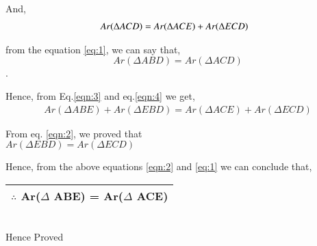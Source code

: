 \documentclass[journal,12pt,twocolumn]{IEEEtran}
\begin{document}
\raggedright
And,
\begin{align}
Ar(\Delta ACD) = Ar(\Delta ACE) + Ar(\Delta ECD)\hspace{0.25cm} 
\label{eqn:4}
\end{align}
\raggedright
from the equation \ref{eq:1}, we can say that,
\centering
$$Ar(\Delta ABD)=Ar(\Delta ACD)$$.
\raggedright
Hence, from Eq.\ref{eqn:3} and eq.\ref{eqn:4} we get,\\
\vspace{0.25cm}
\raggedleft
\begin{align}
Ar(\Delta ABE) + Ar(\Delta EBD) =Ar(\Delta ACE) + Ar(\Delta ECD)
\end{align}
\vspace{0.25cm}
\raggedright
From eq. \ref{eqn:2}, we proved that\\
\centering
\vspace{0.25cm} 
$Ar(\Delta EBD)=Ar(\Delta ECD)$\\
\vspace{0.25cm}
\raggedright
Hence, from the above equations \ref{eqn:2} and \ref{eq:1} we can conclude that,\\
\vspace{0.25cm}
\centering
\begin{tabular}{|c|}
\hline
$\therefore$ Ar($\Delta$ ABE) = Ar($\Delta$ ACE)\\
\hline
\end{tabular}\\
\vspace{0.5cm}
Hence Proved
\end{document}
